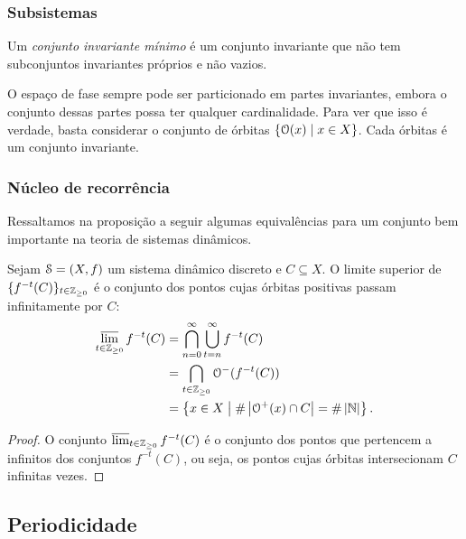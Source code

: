 \begin{comment}
\end{comment}

\subsubsection{Subsistemas}

\begin{definition}
Um \emph{conjunto invariante mínimo} é um conjunto invariante que não tem subconjuntos invariantes próprios e não vazios.
\end{definition}

O espaço de fase sempre pode ser particionado em partes invariantes, embora o conjunto dessas partes possa ter qualquer cardinalidade. Para ver que isso é verdade, basta considerar o conjunto de órbitas $\left\{{\mathcal{O}(x)}\;\middle\vert\;{x \in X}\right\}$. Cada órbitas é um conjunto invariante.

\subsubsection{Núcleo de recorrência}
Ressaltamos na proposição a seguir algumas equivalências para um conjunto bem importante na teoria de sistemas dinâmicos.

\begin{proposition}
Sejam $\mathcal{S}=(X,f)$ um sistema dinâmico discreto e $C \subseteq X$. O limite superior de $\{f^{-t}(C)\}_{t \in \mathbb{Z}_{\geq 0}}$ é o conjunto dos pontos cujas órbitas positivas passam infinitamente por $C$:
		\begin{align*}
		\varlimsup_{t \in \mathbb{Z}_{\geq 0}} f^{-t}(C) &= \bigcap_{n=0}^\infty\bigcup_{t=n}^\infty f^{-t}(C) \\
			&= \bigcap_{t \in \mathbb{Z}_{\geq 0}} \mathcal{O}^-(f^{-t}(C)) \\
			&= \left\{{x \in X}\;\middle\vert\;{\#\left\lvert{\mathcal{O}^+(x) \cap C}\right\rvert = \#\left\lvert{\mathbb{N}}\right\rvert}\right\}.
		\end{align*}
\end{proposition}
\begin{proof}
O conjunto $\varlimsup_{t \in \mathbb{Z}_{\geq 0}} f^{-t}(C)$ é o conjunto dos pontos que pertencem a infinitos dos conjuntos $f^{-t}(C)$, ou seja, os pontos cujas órbitas intersecionam $C$ infinitas vezes.
\end{proof}

\subsection{Periodicidade}

